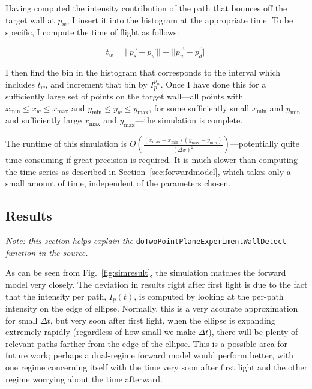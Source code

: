\documentclass[11pt]{article}
\begin{document}
Having computed the intensity contribution of the path that bounces off the target wall at $p_w$, I insert it into the histogram at the appropriate time. To be specific, I compute the time of flight as follows:

\begin{equation}
t_w = ||\vec{p_s}-\vec{p_w}|| + ||\vec{p_w} - \vec{p_d}||
\end{equation}

I then find the bin in the histogram that corresponds to the interval which includes $t_w$, and increment that bin by $I_p^{p_w}$. Once I have done this for a sufficiently large set of points on the target wall---all points with $x_{\mathrm{min}} \le x_w \le x_{\mathrm{max}}$ and $y_{\mathrm{min}} \le y_w \le y_{\mathrm{max}}$, for some sufficiently small $x_{\mathrm{min}}$ and $y_{\mathrm{min}}$ and sufficiently large $x_{\mathrm{max}}$ and $y_{\mathrm{max}}$---the simulation is complete.

The runtime of this simulation is $O(\frac{(x_{\mathrm{max}} - x_{\mathrm{min}})(y_{\mathrm{max}} - y_{\mathrm{min}})}{(\Delta x)^2})$---potentially quite time-consuming if great precision is required. It is much slower than computing the time-series as described in Section~\ref{sec:forwardmodel}, which takes only a small amount of time, independent of the parameters chosen.

\subsection{Results}

\emph{Note: this section helps explain the} \texttt{doTwoPointPlaneExperimentWallDetect} \emph{function in the source.}

As can be seen from Fig.~\ref{fig:simresult}, the simulation matches the forward model very closely. The deviation in results right after first light is due to the fact that the intensity per path, $I_p(t)$, is computed by looking at the per-path intensity on the edge of ellipse. Normally, this is a very accurate approximation for small $\Delta t$, but very soon after first light, when the ellipse is expanding extremely rapidly (regardless of how small we make $\Delta t$), there will be plenty of relevant paths farther from the edge of the ellipse. This is a possible area for future work; perhaps a dual-regime forward model would perform better, with one regime concerning itself with the time very soon after first light and the other regime worrying about the time afterward.
\end{document}
